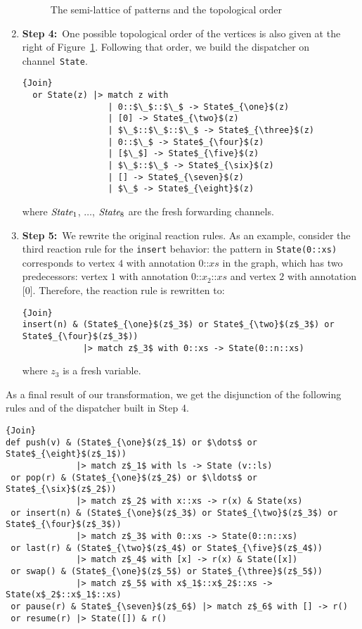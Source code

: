 \documentclass{LMCS}
\let \lst \lstinline
\newcommand{\id}[1]{\textit{#1}}
\newcommand{\cons}[2]{#1\mathord{\texttt{::}}#2}
\newcommand{\single}[1]{\texttt{[}#1\texttt{]}}
\renewcommand{\_}{\mathord{\rule[-.25ex]{1ex}{.15ex}}}
\begin{document}
\begin{enumerate}[\ ]
\begin{figure}[ht]
\begin{picture}
\end{picture} \caption{The semi-lattice of patterns and the topological order}\label{fig.ptjoin.dag}
\end{figure}
\item {\bf Step 4:}\ One possible topological order of the vertices is also
  given at the right of Figure~\ref{fig.ptjoin.dag}. Following that
  order, we build the dispatcher on channel~\lst"State".
\begin{lstlisting}{Join}
  or State(z) |> match z with
                 | 0::$\_$::$\_$ -> State$_{\one}$(z)
                 | [0] -> State$_{\two}$(z)
                 | $\_$::$\_$::$\_$ -> State$_{\three}$(z)
                 | 0::$\_$ -> State$_{\four}$(z)
                 | [$\_$] -> State$_{\five}$(z)
                 | $\_$::$\_$ -> State$_{\six}$(z)
                 | [] -> State$_{\seven}$(z)
                 | $\_$ -> State$_{\eight}$(z)
\end{lstlisting}
  where $\id{State}_{\one}$, $\ldots$, $\id{State}_{\eight}$ are the
  fresh forwarding channels.
\item {\bf Step 5:}\ We rewrite the original reaction rules.  As an example,
  consider the third reaction rule for the \lst"insert" behavior: the
  pattern in \lst"State(0::xs)" corresponds to vertex $4$ with
  annotation $\cons{0}{\id{xs}}$ in the graph, which has two
  predecessors: vertex $1$ with annotation
  $\cons{0}{\cons{\id{x}_2}{\id{xs}}}$ and vertex $2$ with annotation
  $\single{0}$.  Therefore, the reaction rule is rewritten to:
\begin{lstlisting}{Join}
insert(n) & (State$_{\one}$(z$_3$) or State$_{\two}$(z$_3$) or State$_{\four}$(z$_3$)) 
            |> match z$_3$ with 0::xs -> State(0::n::xs)
\end{lstlisting}
where $\id{z}_3$ is a fresh variable.
\end{enumerate}
As a final result of our transformation, we get the disjunction of the
following rules and of the dispatcher built in Step 4.

\begin{lstlisting}{Join}
def push(v) & (State$_{\one}$(z$_1$) or $\dots$ or State$_{\eight}$(z$_1$)) 
              |> match z$_1$ with ls -> State (v::ls) 
 or pop(r) & (State$_{\one}$(z$_2$) or $\ldots$ or State$_{\six}$(z$_2$))
              |> match z$_2$ with x::xs -> r(x) & State(xs)
 or insert(n) & (State$_{\one}$(z$_3$) or State$_{\two}$(z$_3$) or State$_{\four}$(z$_3$))
              |> match z$_3$ with 0::xs -> State(0::n::xs)
 or last(r) & (State$_{\two}$(z$_4$) or State$_{\five}$(z$_4$))
              |> match z$_4$ with [x] -> r(x) & State([x])
 or swap() & (State$_{\one}$(z$_5$) or State$_{\three}$(z$_5$))
              |> match z$_5$ with x$_1$::x$_2$::xs -> State(x$_2$::x$_1$::xs)
 or pause(r) & State$_{\seven}$(z$_6$) |> match z$_6$ with [] -> r()
 or resume(r) |> State([]) & r()
\end{lstlisting}
\end{document}
